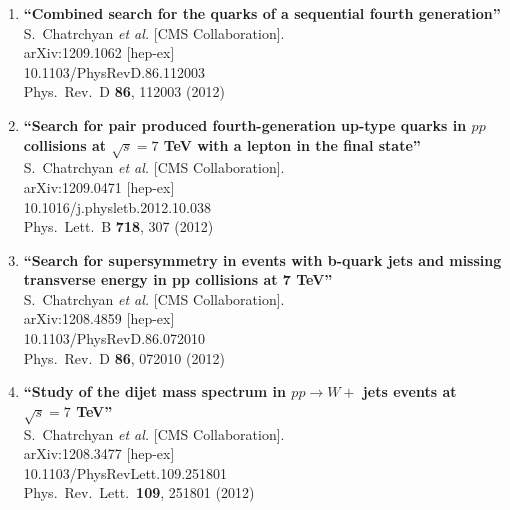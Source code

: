 \documentclass{article}
\begin{document}
\begin{enumerate}
\item%
{\bf ``Combined search for the quarks of a sequential fourth generation''}
  \\{}S.~Chatrchyan {\it et al.}  [CMS Collaboration].
  \\{}arXiv:1209.1062 [hep-ex]
    \\{}10.1103/PhysRevD.86.112003
\\{}Phys.\ Rev.\ D {\bf 86}, 112003 (2012) %


\item%
{\bf ``Search for pair produced fourth-generation up-type quarks in $pp$ collisions at $\sqrt{s}=7$ TeV with a lepton in the final state''}
  \\{}S.~Chatrchyan {\it et al.}  [CMS Collaboration].
  \\{}arXiv:1209.0471 [hep-ex]
    \\{}10.1016/j.physletb.2012.10.038
\\{}Phys.\ Lett.\ B {\bf 718}, 307 (2012) %


\item%
{\bf ``Search for supersymmetry in events with b-quark jets and missing transverse energy in pp collisions at 7 TeV''}
  \\{}S.~Chatrchyan {\it et al.}  [CMS Collaboration].
  \\{}arXiv:1208.4859 [hep-ex]
    \\{}10.1103/PhysRevD.86.072010
\\{}Phys.\ Rev.\ D {\bf 86}, 072010 (2012) %


\item%
{\bf ``Study of the dijet mass spectrum in $pp \to W +$ jets events at $\sqrt{s}=7$ TeV''}
  \\{}S.~Chatrchyan {\it et al.}  [CMS Collaboration].
  \\{}arXiv:1208.3477 [hep-ex]
    \\{}10.1103/PhysRevLett.109.251801
\\{}Phys.\ Rev.\ Lett.\  {\bf 109}, 251801 (2012) %



\end{enumerate}
\end{document}
